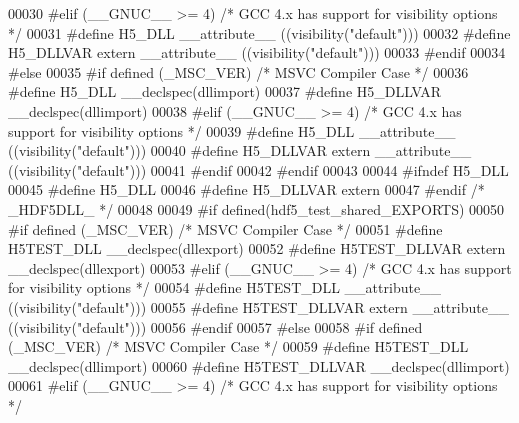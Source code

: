 \begin{DoxyCode}
00030 \textcolor{preprocessor}{  #elif (\_\_GNUC\_\_ >= 4)  }\textcolor{comment}{/* GCC 4.x has support for visibility options */}\textcolor{preprocessor}{}
00031 \textcolor{preprocessor}{    #define H5\_DLL \_\_attribute\_\_ ((visibility("default")))}
00032 \textcolor{preprocessor}{    #define H5\_DLLVAR extern \_\_attribute\_\_ ((visibility("default")))}
00033 \textcolor{preprocessor}{  #endif}
00034 \textcolor{preprocessor}{#else}
00035 \textcolor{preprocessor}{  #if defined (\_MSC\_VER)  }\textcolor{comment}{/* MSVC Compiler Case */}\textcolor{preprocessor}{}
00036 \textcolor{preprocessor}{    #define H5\_DLL \_\_declspec(dllimport)}
00037 \textcolor{preprocessor}{    #define H5\_DLLVAR \_\_declspec(dllimport)}
00038 \textcolor{preprocessor}{  #elif (\_\_GNUC\_\_ >= 4)  }\textcolor{comment}{/* GCC 4.x has support for visibility options */}\textcolor{preprocessor}{}
00039 \textcolor{preprocessor}{    #define H5\_DLL \_\_attribute\_\_ ((visibility("default")))}
00040 \textcolor{preprocessor}{    #define H5\_DLLVAR extern \_\_attribute\_\_ ((visibility("default")))}
00041 \textcolor{preprocessor}{  #endif}
00042 \textcolor{preprocessor}{#endif}
00043 
00044 \textcolor{preprocessor}{#ifndef H5\_DLL}
00045 \textcolor{preprocessor}{  #define H5\_DLL}
00046 \textcolor{preprocessor}{  #define H5\_DLLVAR extern}
00047 \textcolor{preprocessor}{#endif }\textcolor{comment}{/* \_HDF5DLL\_ */}\textcolor{preprocessor}{}
00048 
00049 \textcolor{preprocessor}{#if defined(hdf5\_test\_shared\_EXPORTS)}
00050 \textcolor{preprocessor}{  #if defined (\_MSC\_VER)  }\textcolor{comment}{/* MSVC Compiler Case */}\textcolor{preprocessor}{}
00051 \textcolor{preprocessor}{    #define H5TEST\_DLL \_\_declspec(dllexport)}
00052 \textcolor{preprocessor}{    #define H5TEST\_DLLVAR extern \_\_declspec(dllexport)}
00053 \textcolor{preprocessor}{  #elif (\_\_GNUC\_\_ >= 4)  }\textcolor{comment}{/* GCC 4.x has support for visibility options */}\textcolor{preprocessor}{}
00054 \textcolor{preprocessor}{    #define H5TEST\_DLL \_\_attribute\_\_ ((visibility("default")))}
00055 \textcolor{preprocessor}{    #define H5TEST\_DLLVAR extern \_\_attribute\_\_ ((visibility("default")))}
00056 \textcolor{preprocessor}{  #endif}
00057 \textcolor{preprocessor}{#else}
00058 \textcolor{preprocessor}{  #if defined (\_MSC\_VER)  }\textcolor{comment}{/* MSVC Compiler Case */}\textcolor{preprocessor}{}
00059 \textcolor{preprocessor}{    #define H5TEST\_DLL \_\_declspec(dllimport)}
00060 \textcolor{preprocessor}{    #define H5TEST\_DLLVAR \_\_declspec(dllimport)}
00061 \textcolor{preprocessor}{  #elif (\_\_GNUC\_\_ >= 4)  }\textcolor{comment}{/* GCC 4.x has support for visibility options */}\textcolor{preprocessor}{}

\end{DoxyCode}
